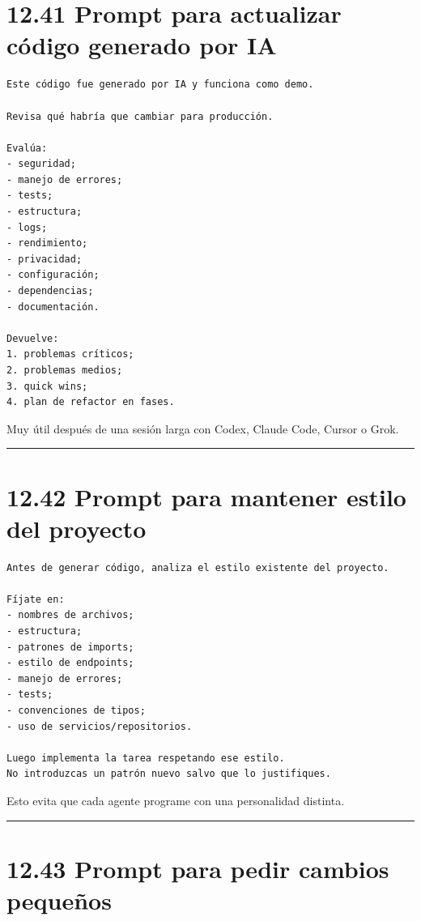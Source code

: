 \section{12.41 Prompt para actualizar código generado por
IA}\label{prompt-para-actualizar-cuxf3digo-generado-por-ia}

\begin{lstlisting}
Este código fue generado por IA y funciona como demo.

Revisa qué habría que cambiar para producción.

Evalúa:
- seguridad;
- manejo de errores;
- tests;
- estructura;
- logs;
- rendimiento;
- privacidad;
- configuración;
- dependencias;
- documentación.

Devuelve:
1. problemas críticos;
2. problemas medios;
3. quick wins;
4. plan de refactor en fases.
\end{lstlisting}

Muy útil después de una sesión larga con Codex, Claude Code, Cursor o
Grok.

\begin{center}\rule{0.5\linewidth}{0.5pt}\end{center}

\section{12.42 Prompt para mantener estilo del
proyecto}\label{prompt-para-mantener-estilo-del-proyecto}

\begin{lstlisting}
Antes de generar código, analiza el estilo existente del proyecto.

Fíjate en:
- nombres de archivos;
- estructura;
- patrones de imports;
- estilo de endpoints;
- manejo de errores;
- tests;
- convenciones de tipos;
- uso de servicios/repositorios.

Luego implementa la tarea respetando ese estilo.
No introduzcas un patrón nuevo salvo que lo justifiques.
\end{lstlisting}

Esto evita que cada agente programe con una personalidad distinta.

\begin{center}\rule{0.5\linewidth}{0.5pt}\end{center}

\section{12.43 Prompt para pedir cambios
pequeños}\label{prompt-para-pedir-cambios-pequeuxf1os}

